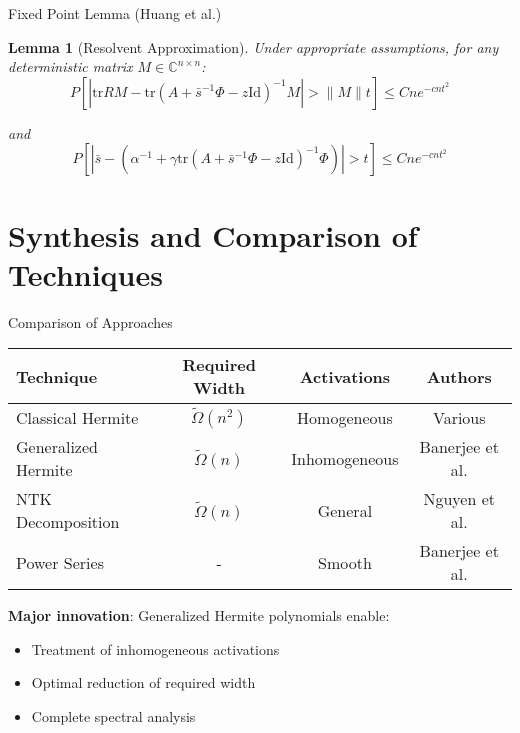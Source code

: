 \documentclass{beamer}
\newtheorem{lemma}[theorem]{Lemma}
\newcommand{\tr}{\text{tr}}
\begin{document}
\begin{frame}{Fixed Point Lemma (Huang et al.)}
  \begin{lemma}[Resolvent Approximation]
  Under appropriate assumptions, for any deterministic matrix $M \in \mathbb{C}^{n \times n}$:
  $$P\left[\left|\tr RM-\tr \left(A+\bar{s}^{-1}\Phi-z\text{Id}\right)^{-1}M\right| >\|M\|t\right] \leq Cne^{-cnt^2}$$
  
  and
  $$P\left[\left|\bar{s}-\left(\alpha^{-1}+\gamma \tr \left(A+\bar{s}^{-1} \Phi-z\text{Id}\right)^{-1}\Phi\right)\right| >t\right] \leq Cne^{-cnt^2}$$
  \end{lemma}
\end{frame}

\section{Synthesis and Comparison of Techniques}

\begin{frame}{Comparison of Approaches}
  \begin{table}[h]
  \centering
  \small
  \begin{tabular}{|l|c|c|c|}
  \hline
  \textbf{Technique} & \textbf{Required Width} & \textbf{Activations} & \textbf{Authors} \\
  \hline
  Classical Hermite & $\tilde{\Omega}(n^2)$ & Homogeneous & Various \\
  \hline
  Generalized Hermite & $\tilde{\Omega}(n)$ & Inhomogeneous & Banerjee et al. \\
  \hline
  NTK Decomposition & $\tilde{\Omega}(n)$ & General & Nguyen et al. \\
  \hline
  Power Series & - & Smooth & Banerjee et al. \\
  \hline
  \end{tabular}
  \end{table}
  
  \textbf{Major innovation}: Generalized Hermite polynomials enable:
  \begin{itemize}
    \item Treatment of inhomogeneous activations
    \item Optimal reduction of required width
    \item Complete spectral analysis
  \end{itemize}
\end{frame}
\end{document}
